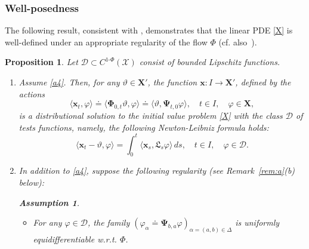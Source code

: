 \documentclass[sn-mathphys-num]{sn-jnl}
\numberwithin{equation}{section}
\theoremstyle{mythm}
\newtheorem{proposition}{Proposition}[section]
\theoremstyle{mydef}
\newtheorem{assumption}{Assumption}\renewcommand{\theassumption}{(A\arabic{assumption})}  %
\renewcommand{\phi}{\varphi}
\renewcommand{\d}{\,d}
\begin{document}
\subsubsection{Well-posedness}
The following result, consistent with \cite[Theorem 4.10.1]{kolokoltsov2019differential}, demonstrates that the linear PDE \eqref{X} is well-defined under an appropriate regularity of the flow \( \Phi \) (cf. also~\cite{STEPANOV20171044,Gigli2014}).
\begin{proposition}\label{propos:ext}
Let $\bm{\mathcal D} \subset C^{1\text{-}\Phi}(\mathcal{X})$ consist of bounded Lipschitz functions.

\begin{enumerate}
\item Assume \ref{a4}. Then, for any $\vartheta \in \bm{X}'$, the function $\bm{x}\colon I \to \bm{X}'$, defined by the actions 
\[
\langle \bm{x}_t, \phi\rangle \doteq \langle \bm \Phi_{0, t}\vartheta,\phi \rangle \doteq \langle\vartheta,\bm{\Psi}_{t,0}\phi\rangle,\quad t \in I, \quad \phi \in \bm{X},
\]
is a distributional solution to the initial value problem \eqref{X} with the class $\bm{\mathcal D}$ of tests functions, namely, the following Newton-Leibniz formula holds: 
\begin{equation}
\langle \bm{x}_t - \vartheta, \phi \rangle 
= \int_0^t \langle \bm{x}_s, \mathfrak{L}_s \phi \rangle \d s,
\quad t \in I, \quad \phi \in \bm{\mathcal D}.\label{weak} 
\end{equation}

\item In addition to \ref{a4}, suppose the following regularity (see Remark~\ref{rem:a}(b) below):
\begin{tcolorbox}
\begin{assumption}
~
\label{a5}
    \begin{itemize}
    \item For any $\phi\in \bm{\mathcal D}$,  the family \((\phi_{\alpha} \doteq \bm{\Psi}_{b,a} \phi )_{\alpha = (a,b) \in \Delta}\) is uniformly equidifferentiable w.r.t. $\Phi$. 
    

\end{itemize}
\end{assumption}
\end{tcolorbox}
\end{enumerate}
\end{proposition}
\end{document}
